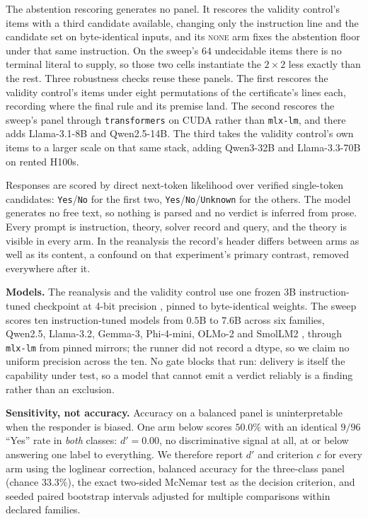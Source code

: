 \documentclass[10pt,twocolumn]{article}
\begin{document}
The abstention rescoring generates no panel. It rescores the validity
control's items with a third candidate available, changing only the instruction line and the candidate set on
byte-identical inputs, and its \textsc{none} arm fixes the abstention floor
under that same instruction. On the sweep's $64$ undecidable items there is
no terminal literal to supply, so those two cells instantiate the $2\times2$
less exactly than the rest. Three robustness checks reuse these panels. The
first rescores the validity control's items under eight permutations of the
certificate's lines each, recording where the final rule and its premise land.
The second rescores the sweep's panel through \texttt{transformers} on CUDA
rather than \texttt{mlx-lm}, and there adds Llama-3.1-8B and Qwen2.5-14B. The
third takes the validity control's own items to a larger scale on that same
stack, adding Qwen3-32B and Llama-3.3-70B on rented H100s.

Responses are scored by direct next-token likelihood over verified single-token
candidates: \texttt{Yes}/\texttt{No} for the first two,
\texttt{Yes}/\texttt{No}/\texttt{Unknown} for the others. The model generates no
free text, so nothing is parsed and no verdict is inferred from prose. Every
prompt is instruction, theory, solver record and query, and the theory is
visible in every arm. In the reanalysis the record's header differs between arms
as well as its content, a confound on that experiment's primary contrast, removed
everywhere after it.

\textbf{Models.} The reanalysis and the validity control use one frozen 3B instruction-tuned
checkpoint at 4-bit precision \citep{team2024qwen}, pinned to byte-identical
weights. The sweep scores ten instruction-tuned models from $0.5$B to $7.6$B across six
families, Qwen2.5, Llama-3.2, Gemma-3, Phi-4-mini, OLMo-2 and SmolLM2
\citep{team2024qwen,grattafiori2024llama,team2025gemma,microsoft2025phi,team2024olmo,allal2025smollm},
through \texttt{mlx-lm} from pinned mirrors; the runner did not record a dtype,
so we claim no uniform precision across the ten. No gate blocks that run:
delivery is itself the capability under test, so a model that cannot emit a
verdict reliably is a finding rather than an exclusion.

\textbf{Sensitivity, not accuracy.} Accuracy on a balanced panel is
uninterpretable when the responder is biased. One arm below scores $50.0\%$ with
an identical $9/96$ ``Yes'' rate in \emph{both} classes: $d' = 0.00$, no
discriminative signal at all, at or below answering one label to everything. We
therefore report $d'$ and criterion $c$ for every arm
\citep{macmillan1991detection,stanislaw1999calculation} using the loglinear
correction, balanced accuracy for the three-class panel (chance $33.3\%$), the
exact two-sided McNemar test \citep{mcnemar1947note} as the decision criterion,
and seeded paired bootstrap intervals \citep{efron1987better} adjusted for
multiple comparisons within declared families.
\end{document}
